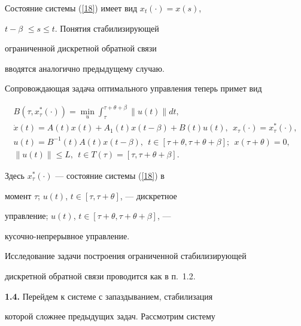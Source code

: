 Состояние системы (\ref{18}) имеет вид $x_t(\cdot)=x(s)$,


$t-\beta$ $\le s \le t$. Понятия стабилизирующей


ограниченной дискретной обратной связи


вводятся аналогично предыдущему случаю.





Сопровождающая задача оптимального управления теперь примет вид


\begin{gather*}


B(\tau,x_{\tau}^*(\cdot))=\min_{u}\int_{\tau}^{\tau+\theta+\beta}


\|u(t)\|dt, \\


%


\Dot x(t)=A(t)x(t)+A_1(t)x(t-\beta)+B(t)u(t),


\ \ x_{\tau}(\cdot)=x_{\tau}^*(\cdot), \\


%


u(t)=B^{-1}(t)A(t)x(t-\beta),\ \ t \in [\tau+\theta,


\tau+\theta+\beta];\ \ x(\tau+\theta)=0, \\


%


\|u(t)\| \le L,\ \ t \in T(\tau)=[\tau, \tau+\theta+\beta].


\end{gather*}


Здесь $x_{\tau}^{*}(\cdot)$ --- состояние системы (\ref{18}) в


момент $\tau$; $u(t)$, $t \in [\tau, \tau+\theta]$, --- дискретное


управление; $u(t)$, $t \in [\tau+\theta, \tau+\theta+\beta]$, ---


кусочно-непрерывное управление.





Исследование задачи построения ограниченной стабилизирующей


дискретной обратной связи проводится как в п.~1.2.


\medskip





{\bf 1.4.} Перейдем к системе с запаздыванием, стабилизация


которой сложнее предыдущих задач. Рассмотрим систему


